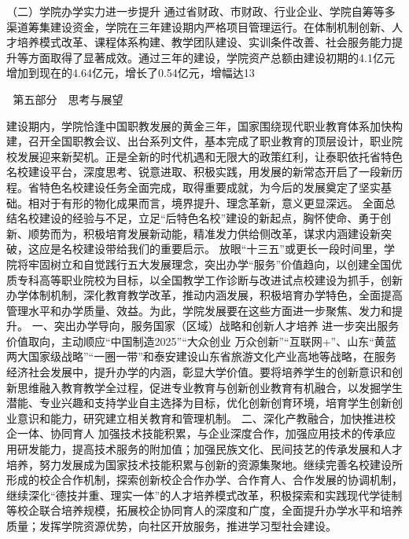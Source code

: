 （二）学院办学实力进一步提升
通过省财政、市财政、行业企业、学院自筹等多渠道筹集建设资金，学院在三年建设期内严格项目管理运行。在体制机制创新、人才培养模式改革、课程体系构建、教学团队建设、实训条件改善、社会服务能力提升等方面取得了显著成效。通过三年的建设，学院资产总额由建设初期的4.1亿元增加到现在的4.64亿元，增长了0.54亿元，增幅达13%


第五部分　思考与展望

建设期内，学院恰逢中国职教发展的黄金三年，国家围绕现代职业教育体系加快构建，召开全国职教会议、出台系列文件，基本完成了职业教育的顶层设计，职业院校发展迎来新契机。正是全新的时代机遇和无限大的政策红利，让泰职依托省特色名校建设平台，深度思考、锐意进取、积极实践，用发展的新常态开启了一段新历程。省特色名校建设任务全面完成，取得重要成就，为今后的发展奠定了坚实基础。相对于有形的物化成果而言，境界提升、理念革新，意义更显深远。
全面总结名校建设的经验与不足，立足“后特色名校”建设的新起点，胸怀使命、勇于创新、顺势而为，积极培育发展新动能，精准发力供给侧改革，谋求内涵建设新突破，这应是名校建设带给我们的重要启示。
放眼“十三五”或更长一段时间里，学院将牢固树立和自觉践行五大发展理念，突出办学“服务”价值趋向，以创建全国优质专科高等职业院校为目标，以全国教学工作诊断与改进试点校建设为抓手，创新办学体制机制，深化教育教学改革，推动内涵发展，积极培育办学特色，全面提高管理水平和办学质量、效益。为此，学院发展要在这些方面进一步聚焦、发力和提升。
一、突出办学导向，服务国家（区域）战略和创新人才培养
进一步突出服务价值取向，主动顺应“中国制造2025”“大众创业 万众创新”“互联网+”、山东“黄蓝两大国家级战略”“一圈一带”和泰安建设山东省旅游文化产业高地等战略，在服务经济社会发展中，提升办学的内涵，彰显大学价值。要将培养学生的创新意识和创新思维融入教育教学全过程，促进专业教育与创新创业教育有机融合，以发掘学生潜能、专业兴趣和支持学业自主选择为目标，优化创新创育环境，培育学生创新创业意识和能力，研究建立相关教育和管理机制。
二、深化产教融合，加快推进校企一体、协同育人
加强技术技能积累，与企业深度合作，加强应用技术的传承应用研发能力，提高技术服务的附加值；加强民族文化、民间技艺的传承发展和人才培养，努力发展成为国家技术技能积累与创新的资源集聚地。继续完善名校建设所形成的校企合作机制，探索创新校企合作办学、合作育人、合作发展的协调机制，继续深化“德技并重、理实一体”的人才培养模式改革，积极探索和实践现代学徒制等校企联合培养规模，拓展校企协同育人的深度和广度，全面提升办学水平和培养质量；发挥学院资源优势，向社区开放服务，推进学习型社会建设。
